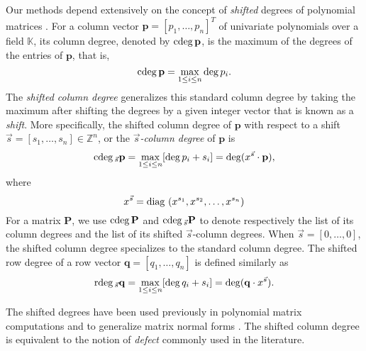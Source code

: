 Our methods depend extensively on the concept of {\em shifted}
degrees of polynomial matrices \cite{BLV:1999}. For a column vector
$\mathbf{p}=\left[p_{1},\dots,p_{n}\right]^{T}$ of univariate polynomials
over a field $\mathbb{K}$, its column degree, denoted by ${\rm cdeg}\,\mathbf{p}$,
is the maximum of the degrees of the entries of $\mathbf{p}$, that
is, 
\[
{\rm cdeg}\,\mathbf{p}=\max_{1\le i\le n}\deg p_{i}.
\]
The \emph{shifted column degree} generalizes this standard column
degree by taking the maximum after shifting the degrees by a given
integer vector that is known as a \emph{shift}. More specifically,
the shifted column degree of $\mathbf{p}$ with respect to a shift
$\vec{s}=\left[s_{1},\dots,s_{n}\right]\in\mathbb{Z}^{n}$, or the
\emph{$\vec{s}$-column degree} of $\mathbf{p}$ is 
\[
{\rm cdeg}\,_{\vec{s}}\mathbf{p}=\max_{1\le i\le n}[\deg p_{i}+s_{i}]=\deg(x^{\vec{s}}\cdot\mathbf{p}),
\]
where 
\[
x^{\vec{s}}={\rm diag}\,\left(x^{s_{1}},x^{s_{2}},\dots,x^{s_{n}}\right)
\]
For a matrix $\mathbf{P}$, we use ${\rm cdeg}\,\mathbf{P}$ and ${\rm cdeg}\,_{\vec{s}}\mathbf{P}$
to denote respectively the list of its column degrees and the list
of its shifted $\vec{s}$-column degrees. When $\vec{s}=\left[0,\dots,0\right]$,
the shifted column degree specializes to the standard column degree.
The shifted row degree of a row vector \textbf{$\mathbf{q}=\left[q_{1},\dots,q_{n}\right]$}
is defined similarly as 
\[
{\rm rdeg}\,_{\vec{s}}\mathbf{q}=\max_{1\le i\le n}[\deg q_{i}+s_{i}]=\deg(\mathbf{q}\cdot x^{\vec{s}}).
\]


The shifted degrees have been used previously in polynomial matrix
computations and to generalize matrix normal forms \cite{BLV:jsc06}.
The shifted column degree is equivalent to the notion of \emph{defect}
commonly used in the literature.

